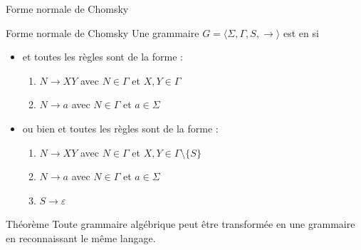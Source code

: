 
\begingroup

\begin{frame}{Forme normale de Chomsky}
  
  \begin{block}{Forme normale de Chomsky}
    Une grammaire $G = \langle \Sigma, \Gamma, S, \rightarrow \rangle$ est en  si
    \begin{itemize}
    \item\vspace{2mm}  et toutes les règles sont de la forme :
      \begin{enumerate}
      \item\vspace{1mm} $N \rightarrow XY$ \hspace{5mm} avec $N\in \Gamma$ et $X, Y \in \Gamma$
      \item $N \rightarrow a$  \hspace{7.5mm} avec $N \in \Gamma$ et $a\in \Sigma$
      \end{enumerate}
    \item\vspace{2mm} ou bien  et toutes les règles sont de la forme :
      \begin{enumerate}
      \item\vspace{1mm} $N \rightarrow XY$ \hspace{5mm} avec $N\in \Gamma$ et $X, Y \in \Gamma \setminus \{S\}$
      \item $N \rightarrow a$  \hspace{7.5mm} avec $N \in \Gamma$ et $a\in \Sigma$
      \item $S \rightarrow \varepsilon$
      \end{enumerate}
    \end{itemize}
  \end{block}

  \begin{block}{Théorème}
    Toute grammaire algébrique peut être transformée en une
    grammaire en  reconnaissant le même langage. 
  \end{block}

\end{frame}

\endgroup
\endinput
